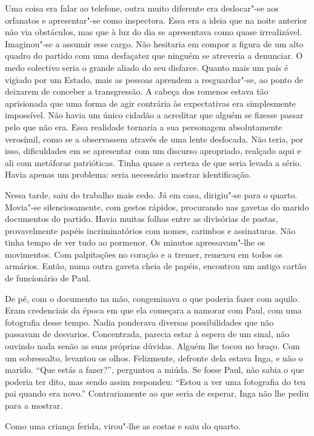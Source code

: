 Uma coisa era falar ao telefone, outra muito diferente era deslocar"-se
aos orfanatos e apresentar"-se como inspectora. Essa era a ideia que na
noite anterior não via obstáculos, mas que à luz do dia se apresentava
como quase irrealizável. Imaginou"-se a assumir esse cargo. Não hesitaria em compor a figura de um alto quadro do partido com uma desfaçatez
que ninguém se atreveria a denunciar. O medo colectivo seria o grande
aliado do seu disfarce. Quanto mais um país é vigiado por um Estado,
mais as pessoas aprendem a resguardar"-se, ao ponto de deixarem de
conceber a transgressão. A cabeça dos romenos estava tão aprisionada que
uma forma de agir contrária às expectativas era simplesmente
impossível. Não havia um único cidadão a acreditar que alguém se fizesse
passar pelo que não era. Essa realidade tornaria a sua personagem
absolutamente verosímil, como se a observassem através de uma lente desfocada.
Não teria, por isso, dificuldades em se apresentar com um discurso
apropriado, realçado aqui e ali com metáforas patrióticas. Tinha quase a
certeza de que seria levada a sério. Havia apenas um problema: seria
necessário mostrar identificação.

Nessa tarde, saiu do trabalho mais cedo. Já em casa, dirigiu"-se para o
quarto. Movia"-se silenciosamente, com gestos rápidos, procurando nas
gavetas do marido documentos do partido. Havia muitas folhas entre as
divisórias de pastas, provavelmente papéis incriminatórios com nomes,
carimbos e assinaturas. Não tinha tempo de ver tudo ao pormenor. Os
minutos apressavam"-lhe os movimentos. Com palpitações no coração e a
tremer, remexeu em todos os armários. Então, numa outra gaveta cheia de
papéis, encontrou um antigo cartão de funcionário de Paul.

De pé, com o documento na mão, congeminava o que poderia fazer com
aquilo. Eram credenciais da época em que ela começara a namorar com
Paul, com uma fotografia desse tempo. Nadia ponderava diversas
possibilidades que não passavam de desvarios. Concentrada, parecia estar
à espera de um sinal, não ouvindo nada senão as suas próprias dúvidas.
Alguém lhe tocou no braço. Com um sobressalto, levantou os olhos.
Felizmente, defronte dela estava Inga, e não o marido. ``Que estás a
fazer?'', perguntou a miúda. Se fosse Paul, não sabia o que poderia ter
dito, mas sendo assim respondeu: ``Estou a ver uma fotografia do teu pai
quando era novo.'' Contrariamente ao que seria de esperar, Inga não lhe
pediu para a mostrar.


Como uma criança ferida, virou"-lhe as costas e saiu do quarto.


